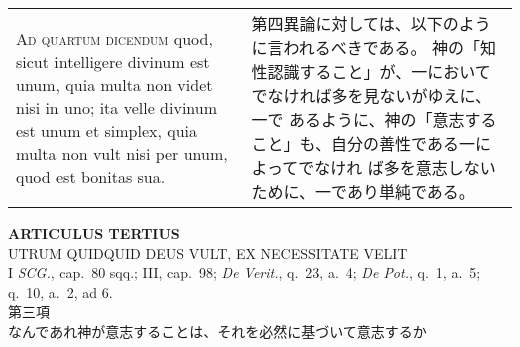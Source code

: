 \documentclass[10pt]{jsarticle} %
\begin{document}
\begin{longtable}{p{21em}p{21em}}
\\





{\scshape Ad quartum dicendum} quod, sicut intelligere divinum est unum,
 quia multa non videt nisi in uno; ita velle divinum est unum et
 simplex, quia multa non vult nisi per unum, quod est bonitas sua.


&



第四異論に対しては、以下のように言われるべきである。
神の「知性認識すること」が、一においてでなければ多を見ないがゆえに、一で
 あるように、神の「意志すること」も、自分の善性である一によってでなけれ
 ば多を意志しないために、一であり単純である。




\end{longtable}
\newpage





\begin{center}
 {\Large {\bf ARTICULUS TERTIUS}}\\
 {\large UTRUM QUIDQUID DEUS VULT, EX NECESSITATE VELIT}\\
 {\footnotesize I {\itshape SCG.}, cap.~80 sqq.; III, cap.~98; {\itshape
 De Verit.}, q.~23, a.~4; {\itshape De Pot.}, q.~1, a.~5; q.~10, a.~2,
 ad 6.}\\
 {\Large 第三項\\なんであれ神が意志することは、それを必然に基づいて意志するか}
\end{center}
\end{document}
